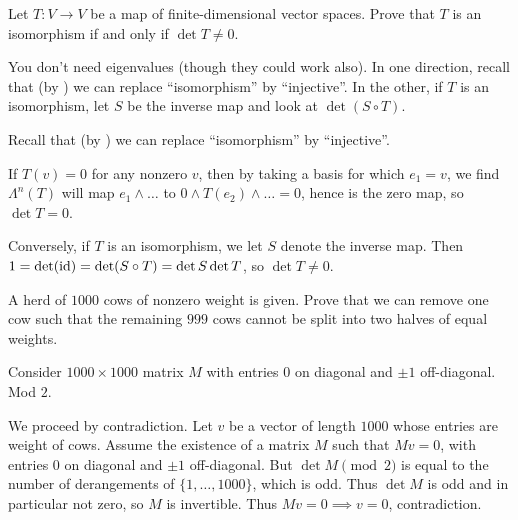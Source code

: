 \begin{problem}
	Let $T \colon V \to V$ be a map of finite-dimensional vector spaces.
	Prove that $T$ is an isomorphism
	if and only if $\det T \neq 0$.
	\begin{hint}
		You don't need eigenvalues (though they could work also).
		In one direction, recall that (by )
		we can replace ``isomorphism'' by ``injective''.
		In the other, if $T$ is an isomorphism,
		let $S$ be the inverse map and look at $\det(S \circ T)$.
	\end{hint}
	\begin{sol}
		Recall that (by \Cref{prob:equal_dimension})
		we can replace ``isomorphism'' by ``injective''.

		If $T(v) = 0$ for any nonzero $v$,
		then by taking a basis for which $e_1 = v$,
		we find $\Lambda^n(T)$ will map $e_1 \wedge \dots$
		to $0 \wedge T(e_2) \wedge \dots = 0$,
		hence is the zero map, so $\det T = 0$.

		Conversely, if $T$ is an isomorphism,
		we let $S$ denote the inverse map.
		Then $1 = \det(\mathrm{id}) = \det(S \circ T) = \det S \det T$,
		so $\det T \neq 0$.
	\end{sol}
\end{problem}

\begin{problem}
	\gim
	A herd of $1000$ cows of nonzero weight is given.
	Prove that we can remove one cow such that the
	remaining $999$ cows cannot be split
	into two halves of equal weights.
	\begin{hint}
		Consider $1000 \times 1000$ matrix $M$
		with entries $0$ on diagonal and $\pm 1$ off-diagonal.
		Mod $2$.
	\end{hint}
	\begin{sol}
		We proceed by contradiction.
		Let $v$ be a vector of length $1000$
		whose entries are weight of cows.
		Assume the existence of a matrix $M$ such that $Mv = 0$,
		with entries $0$ on diagonal and $\pm 1$ off-diagonal.
		But $\det M \pmod 2$ is equal to the number of derangements
		of $\{1, \dots, 1000\}$, which is odd.
		Thus $\det M$ is odd and in particular not zero,
		so $M$ is invertible.
		Thus $Mv = 0 \implies v = 0$, contradiction.
	\end{sol}
\end{problem}

